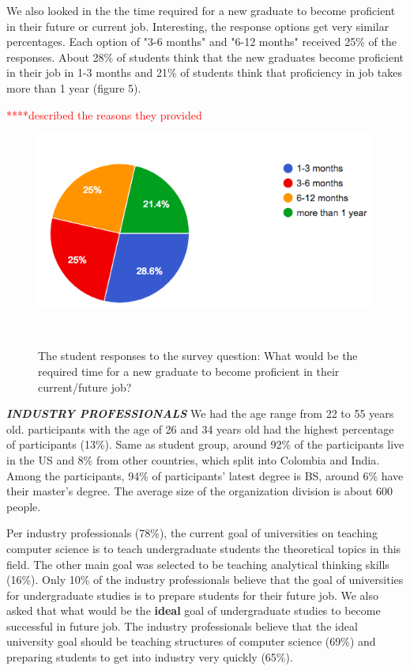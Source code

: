 \documentclass{sigchi}
\begin{document}
We also looked in the the time required for a new graduate to become proficient in their future or current job. Interesting, the response options get very similar percentages.  Each option of "3-6 months" and "6-12 months" received 25\% of the responses. About 28\% of students think that the new graduates become proficient in their job in 1-3 months and 21\% of students think that proficiency in job takes more than 1 year (figure 5).

\textcolor{red}{****described the reasons they provided}

\begin{figure}
\centering
  \includegraphics[width=1.05\columnwidth]{figures/time_proficiency_s}
  \caption{The student responses to the survey question: What would be the required time for a new graduate to become proficient in their current/future job? }~\label{fig:figure5}
\end{figure}


\textit{\textbf{INDUSTRY PROFESSIONALS}}\newline
We had the age range from 22 to 55 years old. participants with the age of 26 and 34 years old had the highest percentage of participants (13\%).
Same as student group, around 92\% of the participants live in the US and 8\% from other countries, which split into Colombia and India. Among the participants, 94\% of participants' latest degree is BS, around 6\% have their master's degree. The average size of the organization division is about 600 people. 

Per industry professionals (78\%), the current goal of universities on teaching computer science is to teach undergraduate students the theoretical topics in this field. The other main goal was selected to be teaching analytical thinking skills (16\%). Only 10\% of the industry professionals believe that the goal of universities for undergraduate studies is to prepare students for their future job. 
We also asked that what would be the \textbf{ideal} goal of undergraduate studies to become successful in future job. The industry professionals believe that the ideal university goal should be teaching structures of computer science (69\%) and preparing students to get into industry very quickly (65\%).
\end{document}
